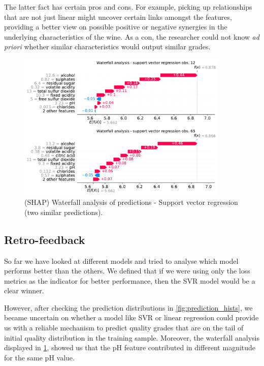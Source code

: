 \documentclass[11pt]{article}
\begin{document}
The latter fact has certain pros and cons.
For example, picking up relationships that are not just linear might uncover certain links amongst the features,
providing a better view on possible positive or negative synergies in the underlying characteristics of the wine.
As a con, the researcher could not know \emph{ad priori} whether similar characteristics would output similar grades.
\begin{figure}[h!]
    \centering
    \includegraphics[width=0.9\textwidth]{figs/shape_svr}
    \caption{(SHAP) Waterfall analysis of predictions - Support vector regression (two similar predictions).}
    \label{fig:shap_svr}
\end{figure}


\subsection{Retro-feedback}\label{subsec:retro-feedback}

So far we have looked at different models and tried to analyse which model performs better than the others.
We defined that if we were using only the loss metrics as the indicator for better performance, then the SVR model
would be a clear winner.

However, after checking the prediction distributions in \cref{fig:prediction_hists}, we became uncertain on whether a
model like SVR or linear regression could provide us with a reliable mechanism to predict quality grades that are on the
tail of initial quality distribution in the training sample.
Moreover, the waterfall analysis displayed in \cref{fig:shap_svr}, showed us that the pH feature contributed in different
magnitude for the same pH value.

\vspace{1pt}
\end{document}
